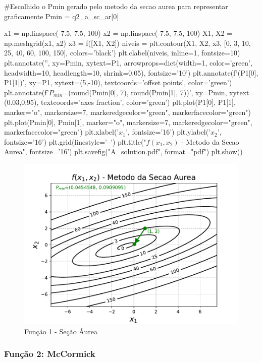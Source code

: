 \documentclass[10pt, a4paper]{article}
\begin{document}
\begin{python}
  #Escolhido o Pmin gerado pelo metodo da secao aurea para representar graficamente
  Pmin = q2_a_sc_ar[0]

  x1 = np.linspace(-7.5, 7.5, 100)
  x2 = np.linspace(-7.5, 7.5, 100)
  X1, X2 = np.meshgrid(x1, x2)
  x3 = f([X1, X2])
  niveis = plt.contour(X1, X2, x3, [0, 3, 10, 25, 40, 60, 100, 150], colors='black')
  plt.clabel(niveis, inline=1, fontsize=10)
  plt.annotate('', xy=Pmin, xytext=P1,
                  arrowprops=dict(width=1, color='green', headwidth=10, headlength=10, shrink=0.05), fontsize='10')
  plt.annotate(f'({P1[0]}, {P1[1]})', xy=P1, xytext=(5,-10), textcoords='offset points', color='green')
  plt.annotate(f'$P_{{min}}$=({round(Pmin[0], 7)}, {round(Pmin[1], 7)})', xy=Pmin, xytext=(0.03,0.95), textcoords='axes fraction', color='green')
  plt.plot(P1[0], P1[1], marker="o", markersize=7, markeredgecolor="green", markerfacecolor="green")
  plt.plot(Pmin[0], Pmin[1], marker="o", markersize=7, markeredgecolor="green", markerfacecolor="green")
  plt.xlabel('$x_1$', fontsize='16')
  plt.ylabel('$x_2$', fontsize='16')
  plt.grid(linestyle='--')
  plt.title("$f(x_1, x_2)$ - Metodo da Secao Aurea", fontsize='16')
  plt.savefig("A_solution.pdf", format="pdf")
  plt.show()
\end{python}

\begin{figure}[htpb]
  \centering
  \includegraphics[width=1\textwidth]{A_solution.pdf}
  \caption{Função 1 - Seção Áurea}
  \label{fig:q2a}
\end{figure}
\subsubsection{Função 2: McCormick}
\end{document}
